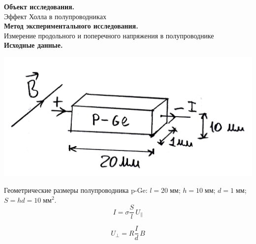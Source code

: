 \documentclass[a4paper]{article}
\begin{document}
{\parindent=0pt\textbf{Объект исследования.}}\\
Эффект Холла в полупроводниках\\

{\parindent=0pt\textbf{Метод экспериментального исследования.}}\\
Измерение продольного и поперечного напряжения в полупроводнике\\

	
	{\parindent=0pt\textbf{Исходные данные.}}\\
	\begin{center}
		\includegraphics[scale=0.3]{pain}
	\end{center}
Геометрические размеры полупроводника p-Ge:
$l=20\;\mbox{мм}$; $h=10\;\mbox{мм}$; $d=1\;\mbox{мм}$; $S=hd=10\;\mbox{мм}^2$.
\begin{equation}
	I=\sigma\frac{S}{l}\,U_{\parallel}
\end{equation}

\begin{equation}
	U_{\perp}=R\frac{I}{d}\,B
\end{equation}

	
	
\end{document}
